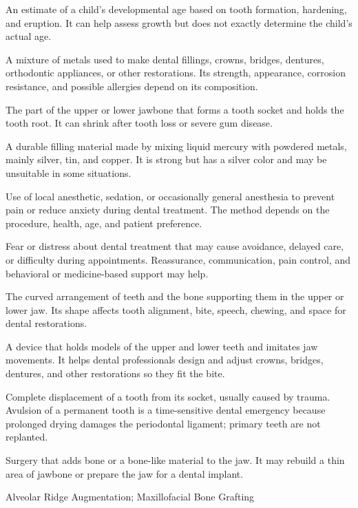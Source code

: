  An estimate of a child’s developmental age based on tooth formation, hardening, and eruption. It can help assess growth but does not exactly determine the child’s actual age.

 A mixture of metals used to make dental fillings, crowns, bridges, dentures, orthodontic appliances, or other restorations. Its strength, appearance, corrosion resistance, and possible allergies depend on its composition.

 The part of the upper or lower jawbone that forms a tooth socket and holds the tooth root. It can shrink after tooth loss or severe gum disease.

 A durable filling material made by mixing liquid mercury with powdered metals, mainly silver, tin, and copper. It is strong but has a silver color and may be unsuitable in some situations.

 Use of local anesthetic, sedation, or occasionally general anesthesia to prevent pain or reduce anxiety during dental treatment. The method depends on the procedure, health, age, and patient preference.

 Fear or distress about dental treatment that may cause avoidance, delayed care, or difficulty during appointments. Reassurance, communication, pain control, and behavioral or medicine-based support may help.

 The curved arrangement of teeth and the bone supporting them in the upper or lower jaw. Its shape affects tooth alignment, bite, speech, chewing, and space for dental restorations.

 A device that holds models of the upper and lower teeth and imitates jaw movements. It helps dental professionals design and adjust crowns, bridges, dentures, and other restorations so they fit the bite.

 Complete displacement of a tooth from its socket, usually caused by trauma. Avulsion of a permanent tooth is a time-sensitive dental emergency because prolonged drying damages the periodontal ligament; primary teeth are not replanted.

 Surgery that adds bone or a bone-like material to the jaw. It may rebuild a thin area of jawbone or prepare the jaw for a dental implant.

\synonyms
Alveolar Ridge Augmentation; Maxillofacial Bone Grafting

